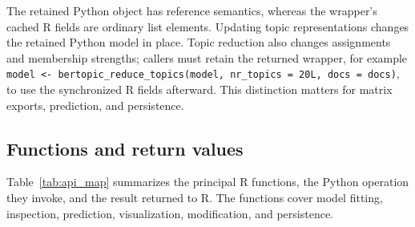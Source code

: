 \documentclass[12pt]{article}
\newcommand{\code}[1]{\texttt{#1}}
\begin{document}
The retained Python object has reference semantics, whereas the wrapper's cached R fields are ordinary list elements. Updating topic representations changes the retained Python model in place. Topic reduction also changes assignments and membership strengths; callers must retain the returned wrapper, for example \code{model <- bertopic\_reduce\_topics(model, nr\_topics = 20L, docs = docs)}, to use the synchronized R fields afterward. This distinction matters for matrix exports, prediction, and persistence.

\subsection{Functions and return values}

Table~\ref{tab:api_map} summarizes the principal R functions, the Python operation they invoke, and the result returned to R. The functions cover model fitting, inspection, prediction, visualization, modification, and persistence.
\end{document}
